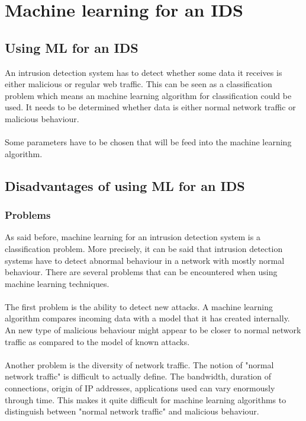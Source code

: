 
\chapter{Machine learning for an IDS} %

\label{Chapter3} %

\section{Using ML for an IDS}
An intrusion detection system has to detect whether some data it receives is either malicious or regular web traffic. This can be seen as a classification problem which means an machine learning algorithm for classification could be used. It needs to be determined whether data is either normal network traffic or malicious behaviour. \\
\\
Some parameters have to be chosen that will be feed into the machine learning algorithm.

\section{Disadvantages of using ML for an IDS}
\subsection{Problems}
As said before, machine learning for an intrusion detection system is a classification problem. More precisely, it can be said that intrusion detection systems have to detect abnormal behaviour in a network with mostly normal behaviour. There are several problems that can be encountered when using machine learning techniques.\\
\\
The first problem is the ability to detect new attacks. A machine learning algorithm compares incoming data with a model that it has created internally. An new type of malicious behaviour might appear to be closer to normal network traffic as compared to the model of known attacks. \\
\\
Another problem is the diversity of network traffic. The notion of "normal network traffic" is difficult to actually define. The bandwidth, duration of connections, origin of IP addresses, applications used can vary enormously through time. This makes it quite difficult for machine learning algorithms to distinguish between "normal network traffic" and malicious behaviour.\cite{ClosedWorld} 

